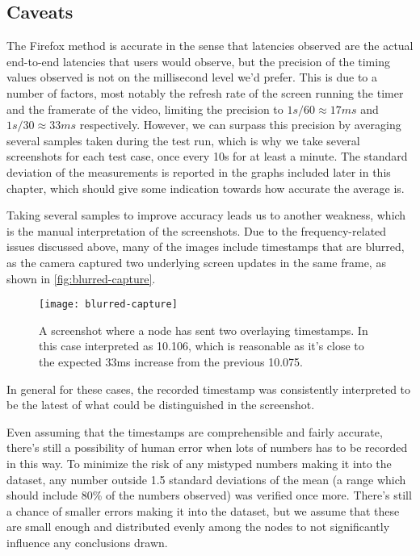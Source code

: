 \subsection{Caveats}

The Firefox method is accurate in the sense that latencies observed are the actual end-to-end latencies that users would observe, but the precision of the timing values observed is not on the millisecond level we'd prefer. This is due to a number of factors, most notably the refresh rate of the screen running the timer and the framerate of the video, limiting the precision to $1s/60\approx17ms$ and $1s/30\approx33ms$ respectively. However, we can surpass this precision by averaging several samples taken during the test run, which is why we take several screenshots for each test case, once every 10s for at least a minute. The standard deviation of the measurements is reported in the graphs included later in this chapter, which should give some indication towards how accurate the average is.

Taking several samples to improve accuracy leads us to another weakness, which is the manual interpretation of the screenshots. Due to the frequency-related issues discussed above, many of the images include timestamps that are blurred, as the camera captured two underlying screen updates in the same frame, as shown in \autoref{fig:blurred-capture}.

\begin{figure}
    \centering
    \texttt{[image: blurred-capture]}
    \caption{A screenshot where a node has sent two overlaying timestamps. In this case interpreted as 10.106, which is reasonable as it's close to the expected 33ms increase from the previous 10.075.}
    \label{fig:blurred-capture}
\end{figure}

In general for these cases, the recorded timestamp was consistently interpreted to be the latest of what could be distinguished in the screenshot.

Even assuming that the timestamps are comprehensible and fairly accurate, there's still a possibility of human error when lots of numbers has to be recorded in this way. To minimize the risk of any mistyped numbers making it into the dataset, any number outside 1.5 standard deviations of the mean (a range which should include 80\% of the numbers observed) was verified once more. There's still a chance of smaller errors making it into the dataset, but we assume that these are small enough and distributed evenly among the nodes to not significantly influence any conclusions drawn.

